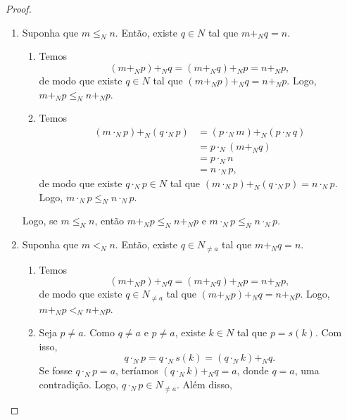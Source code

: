 \begin{proof}
    \leavevmode
        \begin{enumerate}[leftmargin=*, align=left, label=\textbf{(\alph*)}]
            \item Suponha que $m \leq_N n$. Então, existe $q \in N$ tal que $m +_N q=n$.
                \begin{enumerate}[label=\roman*.]
                    \item Temos
                        \[
                            (m +_N p) +_N q = (m +_N q) +_N p = n +_N p,
                        \]
                    de modo que existe $q \in N$ tal que $(m +_N p) +_N q = n +_N p$. Logo, $m +_N p \leq_N n +_N p$.

                    \item Temos
                        \begin{align*}
                            (m \cdot_N p) +_N (q \cdot_N p) &= (p \cdot_N m) +_N (p \cdot_N q) \\
                            &= p \cdot_N (m +_N q) \\
                            &= p \cdot_N n \\
                            &= n \cdot_N p,
                        \end{align*}
                    de modo que existe $q \cdot_N p \in N$ tal que $(m \cdot_N p) +_N (q \cdot_N p) = n \cdot_N p$. Logo, $m \cdot_N p \leq_N n \cdot_N p$.
                \end{enumerate}
            Logo, se $m \leq_N n$, então $m +_N p \leq_N n +_N p$ e $m \cdot_N p \leq_N n \cdot_N p$. \blackproof
            \item Suponha que $m <_N n$. Então, existe $q \in N_{\neq a}$ tal que $m +_N q=n$.
                \begin{enumerate}[label=\roman*.]
                    \item Temos
                        \[
                            (m +_N p) +_N q = (m +_N q) +_N p = n +_N p,
                        \]
                    de modo que existe $q \in N_{\neq a}$ tal que $(m +_N p) +_N q = n +_N p$. Logo, $m +_N p <_N n +_N p$.
                    \item Seja $p \neq a$. Como $q \neq a$ e $p \neq a$, existe $k \in N$ tal que $p=s(k)$. Com isso,
                        \[
                            q \cdot_N p = q \cdot_N s(k) = (q \cdot_N k) +_N q.
                        \]
                    Se fosse $q \cdot_N p=a$, teríamos $(q \cdot_N k) +_N q=a$, donde $q=a$, uma contradição. Logo, $q \cdot_N p \in N_{\neq a}$. Além disso,

\end{enumerate}
\end{enumerate}
\end{proof}
